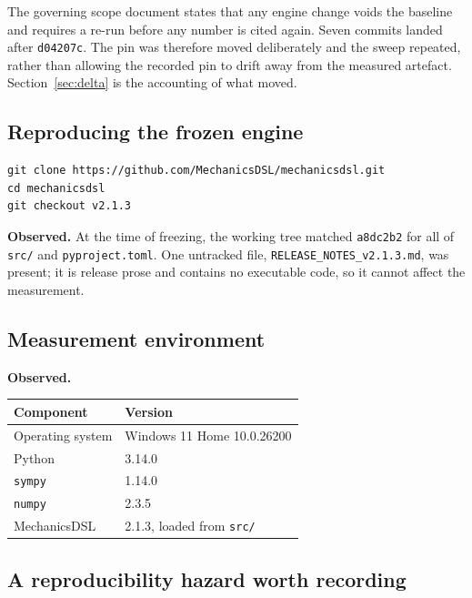 \documentclass[11pt,a4paper]{article}
\newcommand{\gitsha}[1]{\texttt{#1}}
\begin{document}
The governing scope document states that any engine change voids the baseline
and requires a re-run before any number is cited again. Seven commits landed
after \gitsha{d04207c}. The pin was therefore moved deliberately and the sweep
repeated, rather than allowing the recorded pin to drift away from the
measured artefact. Section~\ref{sec:delta} is the accounting of what moved.

\subsection{Reproducing the frozen engine}

\begin{lstlisting}
git clone https://github.com/MechanicsDSL/mechanicsdsl.git
cd mechanicsdsl
git checkout v2.1.3
\end{lstlisting}

\noindent\textbf{Observed.} At the time of freezing, the working tree matched
\gitsha{a8dc2b2} for all of \texttt{src/} and \texttt{pyproject.toml}. One
untracked file, \texttt{RELEASE\_NOTES\_v2.1.3.md}, was present; it is release
prose and contains no executable code, so it cannot affect the measurement.

\subsection{Measurement environment}

\noindent\textbf{Observed.}

\begin{center}
\begin{tabular}{@{}ll@{}}
\toprule
\textbf{Component} & \textbf{Version} \\
\midrule
Operating system  & Windows 11 Home 10.0.26200 \\
Python            & 3.14.0 \\
\texttt{sympy}    & 1.14.0 \\
\texttt{numpy}    & 2.3.5 \\
MechanicsDSL      & 2.1.3, loaded from \texttt{src/} \\
\bottomrule
\end{tabular}
\end{center}

\subsection{A reproducibility hazard worth recording}\label{sec:hazard}
\end{document}
